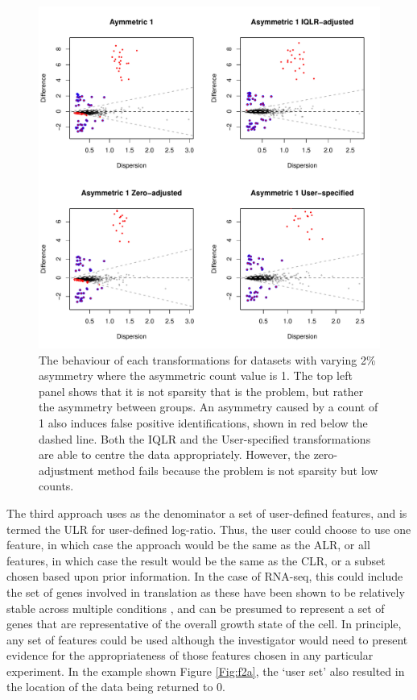 \documentclass[10pt]{article}
\begin{document}
\begin{figure}[!t]
\includegraphics[width=5in]{../figures/Fig_ones.pdf}
\caption{The behaviour of each transformations for datasets with varying 2\% asymmetry where the asymmetric count value is 1. The top left panel shows that it is not sparsity that is the problem, but rather the asymmetry  between groups. An asymmetry caused by a count of 1 also induces false positive identifications, shown in red below the dashed line. Both the IQLR and the User-specified transformations are able to centre the data appropriately. However, the zero-adjustment method fails because the problem is not sparsity but low counts.}
\label{Fig:ones}
\end{figure}


The  third  approach uses as the denominator a set of user-defined features, and is termed the ULR for user-defined log-ratio. Thus, the user could choose to use one feature, in which case the approach would be the same as the ALR, or all features, in which case the result would be the same as the CLR, or a subset chosen based upon prior information. In the case of RNA-seq, this could include the set of genes involved in translation as these have been shown to be relatively stable across multiple conditions , and can be presumed to represent a set of genes that are representative of the overall growth state of the cell. In principle, any set of features could be used although the investigator would need to present evidence for the  appropriateness of those features chosen in any particular experiment. In the example shown Figure \ref{Fig:f2a}, the `user set' also resulted in the location of the data being returned to 0. 
\end{document}

